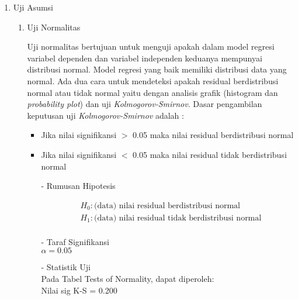 \begin{enumerate}
\def\labelenumi{\arabic{enumi}.}
\tightlist
\item Uji Asumsi

    \begin{enumerate}
    \def\labelenumii{(\alph{enumii})}
    \tightlist
    \item Uji Normalitas \\
    \begin{sloppypar}
    Uji normalitas bertujuan untuk menguji apakah dalam model regresi variabel dependen dan variabel independen keduanya mempunyai distribusi normal. Model regresi yang baik memiliki distribusi data yang normal. Ada dua cara untuk mendeteksi apakah residual berdistribusi normal atau tidak normal yaitu dengan analisis grafik (histogram dan \textit{probability plot}) dan uji \textit{Kolmogorov-Smirnov}. Dasar pengambilan keputusan uji \textit{Kolmogorov-Smirnov} adalah :
    \end{sloppypar}
        \begin{itemize}
        \item Jika nilai signifikansi $>$ 0.05 maka nilai residual berdistribusi normal
        \item Jika nilai signifikansi $<$ 0.05 maka nilai residual tidak berdistribusi normal
        \end{itemize}
        \begin{test}{
            \begin{enumerate}
            \item[-] Rumusan Hipotesis \\
            \begin{fleqn}[\parindent]
                \begin{equation*}
                \begin{split}
                &H_0 : \text{(data) nilai residual berdistribusi normal} \\ 
                &H_1 : \text{(data) nilai residual tidak berdistribusi normal} \\
                \end{split}
                \end{equation*}
            \end{fleqn}
        
            \item[-] Taraf Signifikansi \\
            $\alpha = 0.05$
        
            \item[-] Statistik Uji \\
            Pada Tabel Tests of Normality, dapat diperoleh: \\
            Nilai sig K-S = 0.200
        

\end{enumerate}}
\end{test}
\end{enumerate}
\end{enumerate}
